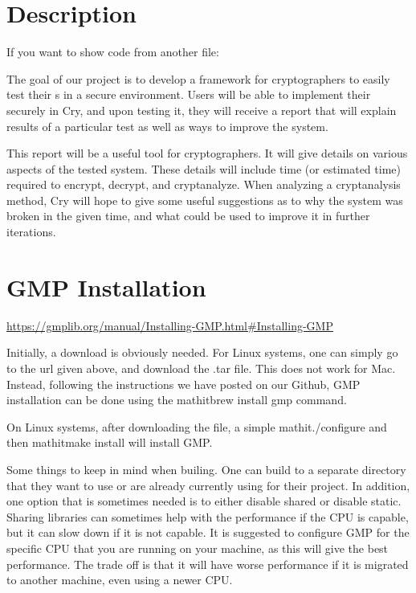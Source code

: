 \section{\cry{} Description}

If you want to show code from another file:
\codes{}


The goal of our project is to develop a framework for
cryptographers to easily test their \cs s in a
secure environment. Users will be able to implement their
\cs{} securely in Cry, and upon testing it, they will
receive a report that will explain results of a particular
test as well as ways to improve the system.

\medskip

This report will be a useful tool for cryptographers. It
will give details on various aspects of the tested system.
These details will include time (or estimated time) required
to encrypt, decrypt, and cryptanalyze. When analyzing a
cryptanalysis method, Cry will hope to give some useful
suggestions as to why the system was broken in the given
time, and what could be used to improve it in further
iterations.


\section{GMP Installation}

\url{https://gmplib.org/manual/Installing-GMP.html#Installing-GMP}

Initially, a download is obviously needed. For Linux systems, one can simply go to the url
given above, and download the .tar file. This does not work for Mac. Instead, following the
instructions we have posted on our Github, GMP installation can be done using the mathit{brew install gmp}
command.

On Linux systems, after downloading the file, a simple mathit{./configure} and then mathit{make install}
will install GMP.

Some things to keep in mind when builing. One can build to a separate directory that they want to use or
are already currently using for their project. In addition, one option that is sometimes needed is to either
disable shared or disable static. Sharing libraries can sometimes help with the performance if the CPU is
capable, but it can slow down if it is not capable. It is suggested to configure GMP for the specific CPU that
you are running on your machine, as this will give the best performance. The trade off is that it will have worse performance
if it is migrated to another machine, even using a newer CPU.

